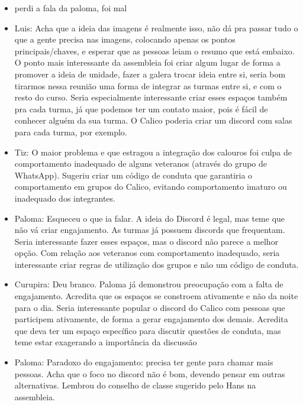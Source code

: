 \documentclass{ata-calico}
\begin{document}
\begin{itemize}

\item perdi a fala da paloma, foi mal

\item Luis: Acha que a ideia das imagens é realmente isso, não dá pra passar tudo o que a gente precisa nas imagens, colocando apenas os pontos principais/chaves, e esperar que as pessoas leiam o resumo que está embaixo. O ponto mais interessante da assembleia foi criar algum lugar de forma a promover a ideia de unidade, fazer a galera trocar ideia entre si, seria bom tirarmos nessa reunião uma forma de integrar as turmas entre si, e com o resto do curso. Seria especialmente interessante criar esses espaços também pra cada turma, já que podemos ter um contato maior, pois é fácil de conhecer alguém da sua turma. O Calico poderia criar um discord com salas para cada turma, por exemplo.

\item Tiz: O maior problema e que estragou a integração dos calouros foi culpa de comportamento inadequado de alguns veteranos (através do grupo de WhatsApp). Sugeriu criar um código de conduta que garantiria o comportamento em grupos do Calico, evitando comportamento imaturo ou inadequado dos integrantes.

\item Paloma: Esqueceu o que ia falar. A ideia do Discord é legal, mas teme que não vá criar engajamento. As turmas já possuem discords que frequentam. Seria interessante fazer esses espaços, mas o discord não parece a melhor opção. Com relação aos veteranos com comportamento inadequado, seria interessante criar regras de utilização dos grupos e não um código de conduta.

\item Curupira: Deu branco. Paloma já demonstrou preocupação com a falta de engajamento. Acredita que os espaços se constroem ativamente e não da noite para o dia. Seria interessante popular o discord do Calico com pessoas que participem ativamente, de forma a gerar engajamento dos demais. Acredita que deva ter um espaço específico para discutir questões de conduta, mas teme estar exagerando a importância da discussão

\item Paloma: Paradoxo do engajamento: precisa ter gente para chamar mais pessoas. Acha que o foco no discord não é bom, devendo pensar em outras alternativas. Lembrou do conselho de classe sugerido pelo Hans na assembleia.


\end{itemize}
\end{document}
